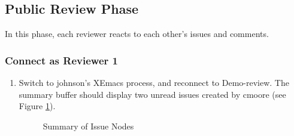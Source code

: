 \subsection{Public Review Phase}
In this phase, each reviewer reacts to each other's issues and comments.

\subsubsection {Connect as Reviewer 1}
\begin{enumerate}
\item Switch to johnson's XEmacs process, and reconnect to
Demo-review. The summary buffer should display two unread issues
created by cmoore (see Figure \ref{summary-issues}).
\begin{figure}[htb]
  {\centerline{}}
  \caption{Summary of Issue Nodes}
  \label{summary-issues}
\end{figure}


\end{enumerate}
